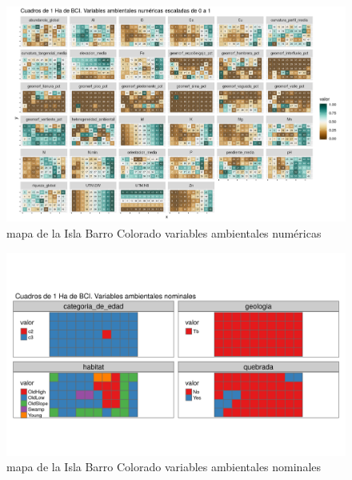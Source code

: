 \documentclass[11pt,]{article}
\begin{document}
\begin{figure}
\centering
\includegraphics[width=1.00000\textwidth]{mapas_variables_ambientales_numericas.png}
\caption{mapa de la Isla Barro Colorado variables ambientales numéricas
\label{fig:bci_map}}
\end{figure}

\begin{figure}
\centering
\includegraphics[width=1.00000\textwidth]{mapas_variables_ambientales_nominales_tmap.png}
\caption{mapa de la Isla Barro Colorado variables ambientales nominales
\label{fig:bci_map}}
\end{figure}
\end{document}

